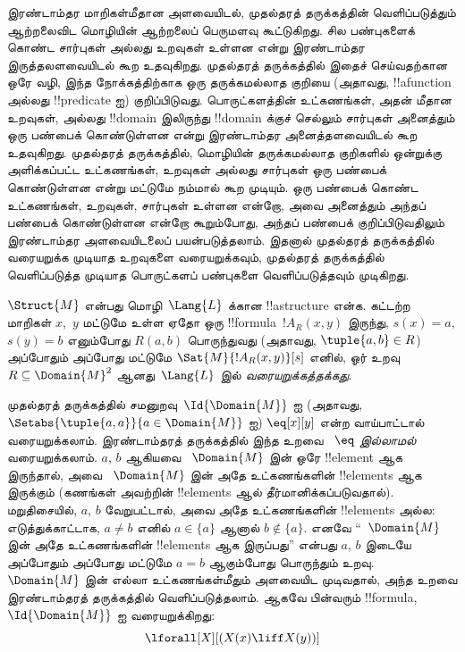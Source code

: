 \documentclass[../../../include/open-logic-section]{subfiles}
\begin{document}


\begin{explain}
இரண்டாம்தர மாறிகள்மீதான அளவையிடல், முதல்தரத் தருக்கத்தின்
வெளிப்படுத்தும் ஆற்றலைவிட மொழியின் ஆற்றலைப் பெருமளவு கூட்டுகிறது.
சில பண்புகளைக் கொண்ட சார்புகள் அல்லது உறவுகள் உள்ளன என்று
இரண்டாம்தர இருத்தலளவையிடல் கூற உதவுகிறது. முதல்தரத் தருக்கத்தில்
இதைச் செய்வதற்கான ஒரே வழி, இந்த நோக்கத்திற்காக ஒரு தருக்கமல்லாத
குறியை (அதாவது, !!a{function} அல்லது !!{predicate} ஐ) குறிப்பிடுவது.
பொருட்களத்தின் உட்கணங்கள், அதன் மீதான உறவுகள், அல்லது
!!{domain} இலிருந்து !!{domain} க்குச் செல்லும் சார்புகள் அனைத்தும்
ஒரு பண்பைக் கொண்டுள்ளன என்று இரண்டாம்தர அனைத்தளவையிடல் கூற
உதவுகிறது. முதல்தரத் தருக்கத்தில், மொழியின் தருக்கமல்லாத குறிகளில்
ஒன்றுக்கு அளிக்கப்பட்ட உட்கணங்கள், உறவுகள் அல்லது சார்புகள் ஒரு
பண்பைக் கொண்டுள்ளன என்று மட்டுமே நம்மால் கூற முடியும். ஒரு பண்பைக்
கொண்ட உட்கணங்கள், உறவுகள், சார்புகள் உள்ளன என்றோ, அவை அனைத்தும்
அந்தப் பண்பைக் கொண்டுள்ளன என்றோ கூறும்போது, அந்தப் பண்பைக்
குறிப்பிடுவதிலும் இரண்டாம்தர அளவையிடலைப் பயன்படுத்தலாம். இதனால்
முதல்தரத் தருக்கத்தில் வரையறுக்க முடியாத உறவுகளை வரையறுக்கவும்,
முதல்தரத் தருக்கத்தில் வெளிப்படுத்த முடியாத பொருட்களப் பண்புகளை
வெளிப்படுத்தவும் முடிகிறது.
\end{explain}

\begin{defn}
$\Struct{M}$ என்பது மொழி~$\Lang{L}$ க்கான !!a{structure} என்க.
கட்டற்ற மாறிகள் $x$,~$y$ மட்டுமே உள்ள ஏதோ ஒரு
!!{formula}~$!A_R(x, y)$ இருந்து, $s(x) = a$, $s(y) = b$ எனும்போது
$R(a, b)$ பொருந்துவது (அதாவது, $\tuple{a,b} \in R$) அப்போதும்
அப்போது மட்டுமே $\Sat{M}{!A_R(x, y)}[s]$ எனில், ஓர் உறவு
~$R \subseteq \Domain{M}^2$ ஆனது~$\Lang{L}$ இல்
\emph{வரையறுக்கத்தக்கது}.
\end{defn}

\begin{ex}
முதல்தரத் தருக்கத்தில் சமனுறவு~$\Id{\Domain{M}}$ ஐ (அதாவது,
$\Setabs{\tuple{a,a}}{a \in \Domain{M}}$ ஐ) $\eq[x][y]$ என்ற
வாய்பாட்டால் வரையறுக்கலாம். இரண்டாம்தரத் தருக்கத்தில் இந்த உறவை
\emph{~$\eq$ இல்லாமல்} வரையறுக்கலாம். $a$, $b$ ஆகியவை
~$\Domain{M}$ இன் ஒரே !!{element} ஆக இருந்தால், அவை
~$\Domain{M}$ இன் அதே உட்கணங்களின் !!{element}s ஆக இருக்கும்
(கணங்கள் அவற்றின் !!{element}s ஆல் தீர்மானிக்கப்படுவதால்).
மறுதிசையில், $a$, $b$ வேறுபட்டால், அவை அதே உட்கணங்களின்
!!{element}s அல்ல: எடுத்துக்காட்டாக, $a \neq b$ எனில்
$a \in \{a\}$ ஆனால் $b \notin \{a\}$. எனவே “~$\Domain{M}$ இன்
அதே உட்கணங்களின் !!{element}s ஆக இருப்பது” என்பது $a$, $b$
இடையே அப்போதும் அப்போது மட்டுமே $a = b$ ஆகும்போது பொருந்தும் உறவு.
~$\Domain{M}$ இன் எல்லா உட்கணங்கள்மீதும் அளவையிட முடிவதால், அந்த
உறவை இரண்டாம்தரத் தருக்கத்தில் வெளிப்படுத்தலாம். ஆகவே பின்வரும்
!!{formula}, $\Id{\Domain{M}}$ ஐ வரையறுக்கிறது:
\[
\lforall[X][(X(x) \liff X(y))]
\]
\end{ex}
\end{document}
